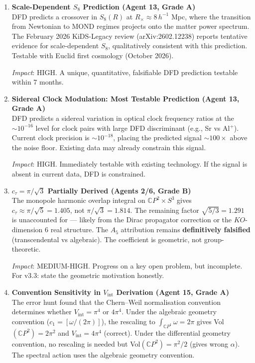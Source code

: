 \documentclass[11pt,a4paper]{article}
\newcommand{\CP}{\mathbb{C}P}
\begin{document}
\begin{enumerate}[label=\textbf{\arabic*.}, leftmargin=1.5cm]
\textit{Impact}: HIGH. Provides the definitive framing for the $\alpha$ claim. Neither overclaims nor undersells.

\item \textbf{Scale-Dependent $S_8$ Prediction (Agent 13, Grade A)}\\
DFD predicts a crossover in $S_8(R)$ at $R_\times \approx 8\,h^{-1}$ Mpc, where the transition from Newtonian to MOND regimes projects onto the matter power spectrum. The February 2026 KiDS-Legacy review (arXiv:2602.12238) reports tentative evidence for scale-dependent $S_8$, qualitatively consistent with this prediction. Testable with Euclid first cosmology (October 2026).

\textit{Impact}: HIGH. A unique, quantitative, falsifiable DFD prediction testable within 7 months.

\item \textbf{Sidereal Clock Modulation: Most Testable Prediction (Agent 13, Grade A)}\\
DFD predicts a sidereal variation in optical clock frequency ratios at the $\sim 10^{-16}$ level for clock pairs with large DFD discriminant (e.g., Sr vs Al$^+$). Current clock precision is $\sim 10^{-18}$, placing the predicted signal $\sim 100\times$ above the noise floor. Existing data may already constrain this signal.

\textit{Impact}: HIGH. Immediately testable with existing technology. If the signal is absent in current data, DFD is constrained.

\item \textbf{$c_\tau = \pi/\sqrt{3}$ Partially Derived (Agents 2/6, Grade B)}\\
The monopole harmonic overlap integral on $\CP^2 \times S^3$ gives $c_\tau \approx \pi/\sqrt{5} = 1.405$, not $\pi/\sqrt{3} = 1.814$. The remaining factor $\sqrt{5/3} = 1.291$ is unaccounted for --- likely from the Dirac propagator correction or the $KO$-dimension 6 real structure. The $A_5$ attribution remains \textbf{definitively falsified} (transcendental vs algebraic). The coefficient is geometric, not group-theoretic.

\textit{Impact}: MEDIUM-HIGH. Progress on a key open problem, but incomplete. For v3.3: state the geometric motivation honestly.

\item \textbf{Convention Sensitivity in $V_{\mathrm{int}}$ Derivation (Agent 15, Grade A)}\\
The error hunt found that the Chern--Weil normalisation convention determines whether $V_{\mathrm{int}} = \pi^4$ or $4\pi^4$. Under the algebraic geometry convention ($c_1 = [\omega/(2\pi)]$), the rescaling to $\int_{\CP^1}\omega = 2\pi$ gives Vol$(\CP^2) = 2\pi^2$ and $V_{\mathrm{int}} = 4\pi^4$ (correct). Under the differential geometry convention, no rescaling is needed but Vol$(\CP^2) = \pi^2/2$ (gives wrong $\alpha$). The spectral action uses the algebraic geometry convention.


\end{enumerate}
\end{document}
